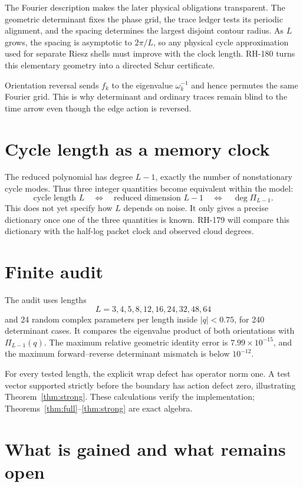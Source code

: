 \documentclass[12pt]{article}
\theoremstyle{remark}
\begin{document}
The Fourier description makes the later physical obligations transparent.
The geometric determinant fixes the phase grid, the trace ledger tests its
periodic alignment, and the spacing determines the largest disjoint contour
radius.  As $L$ grows, the spacing is asymptotic to $2\pi/L$, so any physical
cycle approximation used for separate Riesz shells must improve with the
clock length.  RH-180 turns this elementary geometry into a directed Schur
certificate.

Orientation reversal sends $f_k$ to the eigenvalue $\omega_k^{-1}$ and hence
permutes the same Fourier grid.  This is why determinant and ordinary traces
remain blind to the time arrow even though the edge action is reversed.

\section{Cycle length as a memory clock}

The reduced polynomial has degree $L-1$, exactly the number of nonstationary
cycle modes.  Thus three integer quantities become equivalent within the
model:
\[
 \text{cycle length }L
 \quad\Longleftrightarrow\quad
 \text{reduced dimension }L-1
 \quad\Longleftrightarrow\quad
 \deg\Pi_{L-1}.
\]
This does not yet specify how $L$ depends on noise.  It only gives a precise
dictionary once one of the three quantities is known.  RH-179 will compare
this dictionary with the half-log packet clock and observed cloud degrees.

\section{Finite audit}

The audit uses lengths
\[
 L=3,4,5,8,12,16,24,32,48,64
\]
and 24 random complex parameters per length inside $|q|<0.75$, for 240
determinant cases.  It compares the eigenvalue product of both orientations
with $\Pi_{L-1}(q)$.  The maximum relative geometric identity error is
$7.99\times10^{-15}$, and the maximum forward--reverse determinant mismatch
is below $10^{-12}$.

For every tested length, the explicit wrap defect has operator norm one.  A
test vector supported strictly before the boundary has action defect zero,
illustrating Theorem~\ref{thm:strong}.  These calculations verify the
implementation; Theorems~\ref{thm:full}--\ref{thm:strong} are exact algebra.

\section{What is gained and what remains open}
\end{document}
